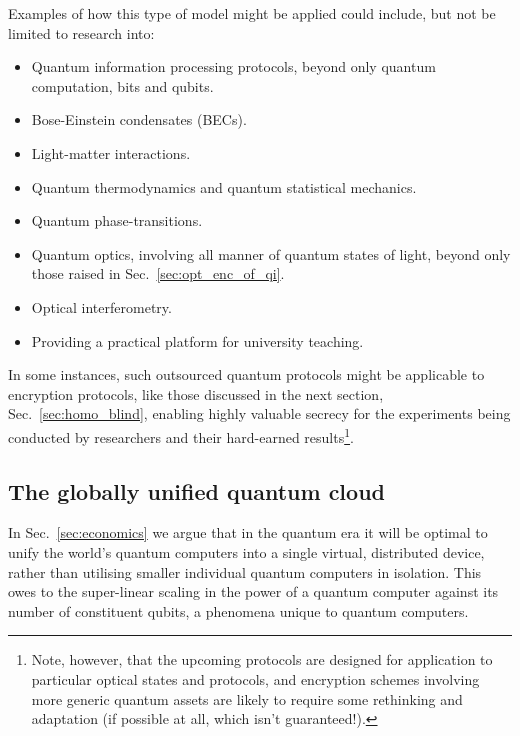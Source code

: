Examples of how this type of model might be applied could include, but not be limited to research into:
\begin{itemize}
	\item Quantum information processing protocols, beyond only quantum computation, bits and qubits.
	\item Bose-Einstein condensates (BECs).
	\item Light-matter interactions.
	\item Quantum thermodynamics and quantum statistical mechanics.
	\item Quantum phase-transitions.
	\item Quantum optics, involving all manner of quantum states of light, beyond only those raised in Sec.~\ref{sec:opt_enc_of_qi}.
	\item Optical interferometry.
	\item Providing a practical platform for university teaching.
\end{itemize}

In some instances, such outsourced quantum protocols might be applicable to encryption protocols, like those discussed in the next section, Sec.~\ref{sec:homo_blind}, enabling highly valuable secrecy for the experiments being conducted by researchers and their hard-earned results\footnote{Note, however, that the upcoming protocols are designed for application to particular optical states and protocols, and encryption schemes involving more generic quantum assets are likely to require some rethinking and adaptation (if possible at all, which isn't guaranteed!).}.

%
%

\subsection{The globally unified quantum cloud}

In Sec.~\ref{sec:economics} we argue that in the quantum era it will be optimal to unify the world's quantum computers into a single virtual, distributed device, rather than utilising smaller individual quantum computers in isolation. This owes to the super-linear scaling in the power of a quantum computer against its number of constituent qubits, a phenomena unique to quantum computers.

